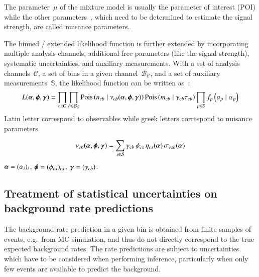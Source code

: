 The parameter~$\mu$ of the mixture model is usually the parameter of
interest (POI) while the other parameters~\boldtheta, which need to be
determined to estimate the signal strength, are called nuisance
parameters.


The binned / extended likelihood function is further extended by
incorporating multiple analysis channels, additional free parameters
(like the signal strength), systematic uncertainties, and auxiliary
measurements. With a set of analysis channels~$\mathcal{C}$, a set of
bins in a given channel~$\mathcal{B}_\mathcal{C}$, and a set of
auxiliary measurements~$\mathbb{S}$, the likelihood function can be
written as~\cite{cranmer2012}:
\begin{align*}
  L(\boldalpha, \boldphi, \boldgamma) =
  \prod_{c \in \mathcal{C}} \prod_{b \in \mathcal{B}_{\mathcal{C}}}
  \mathrm{Pois}\left( n_{cb} \mid \nu_{cb}(\boldalpha, \boldphi, \boldgamma) \right)
  \mathrm{Pois}\left(m_{cb} \mid  \gamma_{cb} \tau_{cb} \right)
  \prod_{p \in \mathbb{S}} f_p\left(a_p \mid \alpha_p \right)
\end{align*}
Latin letter correspond to observables while greek letters correspond
to nuisance parameters.

\begin{align*}
  \nu_{cb}(\boldalpha, \boldphi, \boldgamma) = \sum_{s \in \mathcal{S}} \gamma_{cb} \, \phi_{cs} \, \eta_{cs}(\boldalpha) \, \sigma_{csb}(\boldalpha)
\end{align*}
$\boldalpha = (\alpha_i)_i$, $\boldphi = (\phi_{cs})_{cs}$,
$\boldgamma = (\gamma_{cb})$.




\subsection{Treatment of statistical uncertainties on background rate
  predictions}%
\label{sec:barlow_beeston}

The background rate prediction in a given bin is obtained from finite
samples of events, e.g.\ from MC simulation, and thus do not directly
correspond to the true expected background rates. The rate predictions
are subject to uncertainties which have to be considered when
performing inference, particularly when only few events are available
to predict the background.

